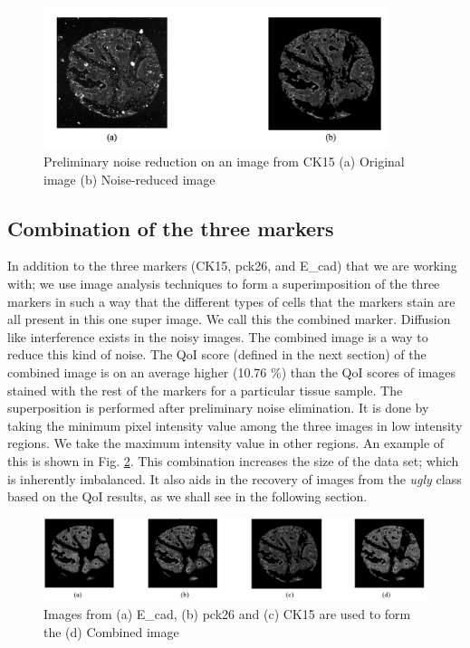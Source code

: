 \begin{figure}[H]
\centering
\includegraphics[width=0.9\textwidth]{img/SPIE_noise_reduction}
\caption{ Preliminary noise reduction on an image from CK15 (a) Original image (b) Noise-reduced image
}
\label{fig:SPIE_noise_reduction}
\end{figure}

\subsection{Combination of the three markers}
In addition to the three markers (CK15, pck26, and E\_cad) that we are working with; we use image analysis techniques to form a superimposition of the three markers in such a way that the different types of cells that the markers stain are all present in this one super image. We call this the combined marker. Diffusion like interference exists in the noisy images. The combined image is a way to reduce this kind of noise. The QoI score (defined in the next section) of the combined image is on an average higher (10.76 \%) than the QoI scores of images stained with the rest of the markers for a particular tissue sample. The superposition is performed after preliminary noise elimination. It is done by taking the minimum pixel intensity value among the three images in low intensity regions. We take the maximum intensity value in other regions. An example of this is shown in Fig. \ref{fig:SPIE_combination}. This combination increases the size of the data set; which is inherently imbalanced. It also aids in the recovery of images from the \textit{ugly} class based on the QoI results, as we shall see in the following section.

\begin{figure}[H]
\centering
\includegraphics[width=1.0\textwidth]{img/SPIE_combined}
\caption{Images from (a) E\_cad, (b) pck26 and (c) CK15 are used to form the (d) Combined image}
\label{fig:SPIE_combination}
\end{figure}

